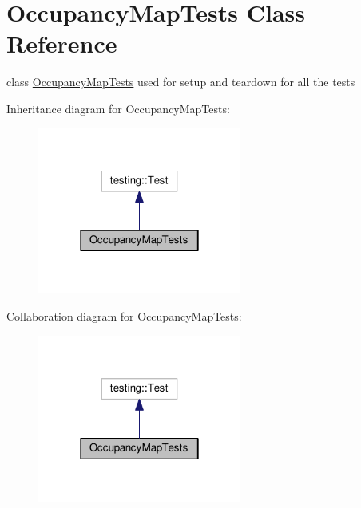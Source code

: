 \hypertarget{classOccupancyMapTests}{}\section{Occupancy\+Map\+Tests Class Reference}
\label{classOccupancyMapTests}


class \hyperlink{classOccupancyMapTests}{Occupancy\+Map\+Tests} used for setup and teardown for all the tests  




Inheritance diagram for Occupancy\+Map\+Tests\+:
\nopagebreak
\begin{figure}[H]
\begin{center}
\leavevmode
\includegraphics[width=190pt]{classOccupancyMapTests__inherit__graph}
\end{center}
\end{figure}


Collaboration diagram for Occupancy\+Map\+Tests\+:
\nopagebreak
\begin{figure}[H]
\begin{center}
\leavevmode
\includegraphics[width=190pt]{classOccupancyMapTests__coll__graph}
\end{center}
\end{figure}
